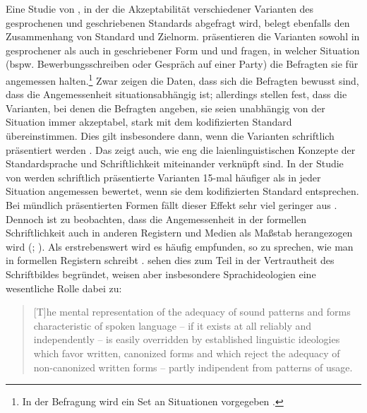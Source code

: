 Eine Studie von \citet[]{Koplenig.2016}, in der die Akzeptabilität verschiedener Varianten des gesprochenen und geschriebenen Standards abgefragt wird, belegt ebenfalls den Zusammenhang von Standard und Zielnorm.  
\citet[]{Koplenig.2016} präsentieren die Varianten sowohl in gesprochener als auch in geschriebener Form und und fragen, in welcher Situation (bspw. Bewerbungsschreiben oder Gespräch auf einer Party) die Befragten sie für angemessen halten.\footnote{In der Befragung wird ein Set an Situationen vorgegeben \citep[s.][180]{Koplenig.2016}.} 
Zwar zeigen die Daten, dass sich die Befragten bewusst sind, dass die Angemessenheit situationsabhängig ist;
allerdings stellen \citet[183]{Koplenig.2016} fest, dass die Varianten, bei denen die Befragten angeben, sie seien unabhängig von der Situation immer akzeptabel, stark mit dem kodifizierten Standard übereinstimmen.
Dies gilt insbesondere dann, wenn die Varianten schriftlich präsentiert werden \citep[s.][190]{Koplenig.2016}. 
Das zeigt auch, wie eng die laienlinguistischen Konzepte der Standardsprache und Schriftlichkeit miteinander verknüpft sind. 
In der Studie von \citet[187]{Koplenig.2016} werden schriftlich präsentierte Varianten 15-mal häufiger als in jeder Situation angemessen bewertet, wenn sie dem kodifizierten Standard entsprechen. 
Bei mündlich präsentierten Formen fällt dieser Effekt sehr viel geringer aus \citep[s.][187]{Koplenig.2016}. 
Dennoch ist zu beobachten, dass die Angemessenheit in der formellen Schriftlichkeit auch in anderen Registern und Medien als Maßstab herangezogen wird (\citealp[s.][32]{Schneider2013}; \citealp[190]{Koplenig.2016}). 
Als erstrebenswert wird es häufig empfunden, so zu sprechen, wie man in formellen Registern schreibt \citep[s.][172]{Beuge2017}. 
\citet[190]{Koplenig.2016} sehen dies zum Teil in der Vertrautheit des Schriftbildes begründet, weisen aber insbesondere Sprachideologien eine wesentliche Rolle dabei zu:  
\begin{quote}[T]he mental representation of the adequacy of sound patterns and forms characteristic of spoken language -- if it exists at all reliably and independently -- is easily overridden by established linguistic ideologies which favor written, canonized forms and which reject the adequacy of non-canonized written forms -- partly indipendent from patterns of usage. \citep[192]{Koplenig.2016}\end{quote}
